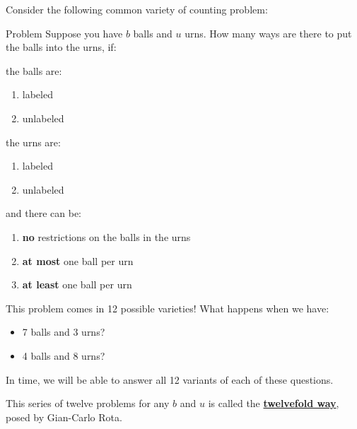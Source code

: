 \label{01-0128}
Consider the following common variety of counting problem: 
\begin{problem}[Classic]{Problem}
Suppose you have $b$ balls and $u$ urns. How many ways are there to put the balls into the urns, if: 
\begin{center}
	\begin{minipage}[t]{0.24\linewidth}
		the balls are:
		\begin{enumerate}
		\item labeled 
		\item unlabeled 
		\end{enumerate}
	\end{minipage}
	\begin{minipage}[t]{0.24\linewidth}
		the urns are:
		\begin{enumerate}
		\item labeled 
		\item unlabeled 
		\end{enumerate}
	\end{minipage}
	\begin{minipage}[t]{0.5\linewidth}
		and there can be: 
		\begin{enumerate}
			\item \textbf{no} restrictions on the balls in the urns
			\item \textbf{at most} one ball per urn
			\item \textbf{at least} one ball per urn
			\end{enumerate}
	\end{minipage}
\end{center}
\end{problem}
This problem comes in 12 possible varieties! What happens when we have: 
\begin{itemize}
	\item 7 balls and 3 urns? 
	\item 4 balls and 8 urns? 
\end{itemize}
In time, we will be able to answer all 12 variants of each of these questions. 

\begin{remark}
	This series of twelve problems for any $b$ and $u$ is called the 
	\href{https://en.wikipedia.org/wiki/Twelvefold_way}{\textbf{twelvefold way}},
	posed by Gian-Carlo Rota. 
\end{remark}

\newpage
% 